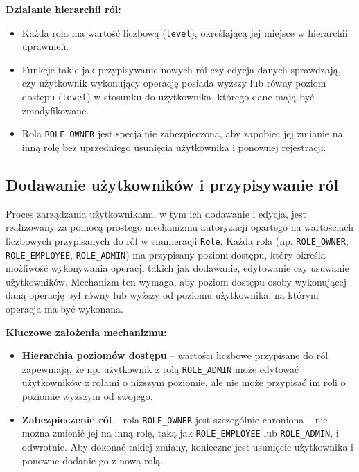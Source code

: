 \textbf{Działanie hierarchii ról:}
\begin{itemize}
    \item Każda rola ma wartość liczbową (\texttt{level}), określającą jej miejsce w hierarchii uprawnień.
    \item Funkcje takie jak przypisywanie nowych ról czy edycja danych sprawdzają, czy użytkownik wykonujący operację posiada wyższy lub równy poziom dostępu (\texttt{level}) w stosunku do użytkownika, którego dane mają być zmodyfikowane.
    \item Rola \texttt{ROLE\_OWNER} jest specjalnie zabezpieczona, aby zapobiec jej zmianie na inną rolę bez uprzedniego usunięcia użytkownika i ponownej rejestracji.
\end{itemize}


\subsection{Dodawanie użytkowników i przypisywanie ról}

Proces zarządzania użytkownikami, w tym ich dodawanie i edycja, jest realizowany za pomocą prostego mechanizmu autoryzacji opartego na wartościach liczbowych przypisanych do ról w enumeracji \texttt{Role}. Każda rola (np. \texttt{ROLE\_OWNER}, \texttt{ROLE\_EMPLOYEE}, \texttt{ROLE\_ADMIN}) ma przypisany poziom dostępu, który określa możliwość wykonywania operacji takich jak dodawanie, edytowanie czy usuwanie użytkowników. Mechanizm ten wymaga, aby poziom dostępu osoby wykonującej daną operację był równy lub wyższy od poziomu użytkownika, na którym operacja ma być wykonana.

\textbf{Kluczowe założenia mechanizmu:}
\begin{itemize}
    \item \textbf{Hierarchia poziomów dostępu} -- wartości liczbowe przypisane do ról zapewniają, że np. użytkownik z rolą \texttt{ROLE\_ADMIN} może edytować użytkowników z rolami o niższym poziomie, ale nie może przypisać im roli o poziomie wyższym od swojego.
    \item \textbf{Zabezpieczenie ról} -- rola \texttt{ROLE\_OWNER} jest szczególnie chroniona – nie można zmienić jej na inną rolę, taką jak \texttt{ROLE\_EMPLOYEE} lub \texttt{ROLE\_ADMIN}, i odwrotnie. Aby dokonać takiej zmiany, konieczne jest usunięcie użytkownika i ponowne dodanie go z nową rolą.
\end{itemize}

